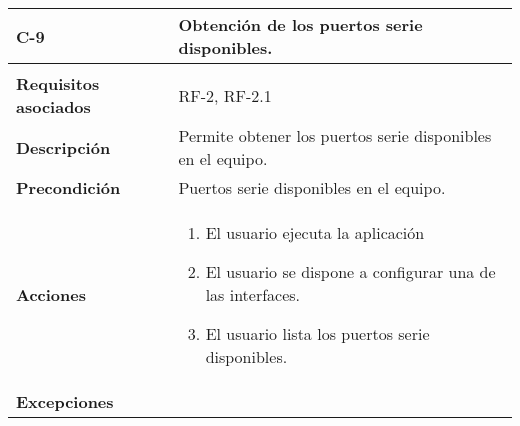 \begin{longtable}[H]{@{}ll@{}}
\toprule
\begin{minipage}[b]{0.23\columnwidth}\raggedright\strut
\textbf{C-9}\strut
\end{minipage} & \begin{minipage}[b]{0.71\columnwidth}\raggedright\strut
\textbf{Obtención de los puertos serie disponibles.}\strut
\end{minipage}\tabularnewline
\midrule
\endhead
\tabularnewline
\begin{minipage}[t]{0.23\columnwidth}\raggedright\strut
\textbf{Requisitos asociados}\strut
\end{minipage} & \begin{minipage}[t]{0.71\columnwidth}\raggedright\strut
RF-2, RF-2.1\strut
\end{minipage}\tabularnewline
\begin{minipage}[t]{0.23\columnwidth}\raggedright\strut
\textbf{Descripción}\strut
\end{minipage} & \begin{minipage}[t]{0.71\columnwidth}\raggedright\strut
Permite obtener los puertos serie disponibles en el equipo.\strut
\end{minipage}\tabularnewline
\begin{minipage}[t]{0.23\columnwidth}\raggedright\strut
\textbf{Precondición}\strut
\end{minipage} & \begin{minipage}[t]{0.71\columnwidth}\raggedright\strut
Puertos serie disponibles en el equipo.
\strut
\end{minipage}\tabularnewline
\begin{minipage}[t]{0.23\columnwidth}\raggedright\strut
\textbf{Acciones}\strut
\end{minipage} & \begin{minipage}[t]{0.71\columnwidth}\raggedright\strut
\begin{enumerate}
\def\labelenumi{\arabic{enumi}.}
\item
El usuario ejecuta la aplicación
\item
El usuario se dispone a configurar una de las interfaces.
\item
El usuario lista los puertos serie disponibles.
\end{enumerate}\strut
\end{minipage}\tabularnewline
\begin{minipage}[t]{0.23\columnwidth}\raggedright\strut
\textbf{Excepciones}\strut
\end{minipage} & \begin{minipage}[t]{0.71\columnwidth}\raggedright\strut

\end{minipage}
\end{longtable}

